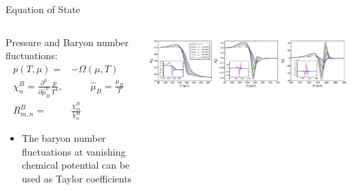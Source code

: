 \begin{frame}[fragile]{Equation of State}
    \begin{columns}
        \begin{column}{0.5\textwidth}
           \vspace{-6.5cm}
           \begin{block}{Pressure and Baryon number fluctuations:}
           \begin{align}
                p(T,\mu)=&-\Omega(\mu,T)\\[2ex]
                \chi^B_n=\frac{\partial^n}{\partial\hat{\mu}_B^n}\frac{p}{T^4},&\qquad \hat{\mu}_B=\frac{\mu_B}{T}\\[2ex]
                R^B_{m,n}=&\frac{\chi^B_m}{\chi^B_n}
           \end{align}
           \end{block}
           \hspace{0.8cm}
           \begin{itemize}
           \item The baryon number fluctuations at vanishing chemical potential can be used as Taylor coefficients
           \end{itemize}
        \end{column}
        \begin{column}{0.5\textwidth}
            \includegraphics[width=1.\linewidth,trim={0 0 23cm 0}, clip]{Images/Figures/R42R62R82-T-muB0to400.pdf}
            \vspace{-0.8cm}
            \hspace{2cm}{\scriptsize Phys.Rev.D 104 (2021) 9, 094047}            
            \vspace{8cm}
        \end{column}
    \end{columns}
\end{frame}
